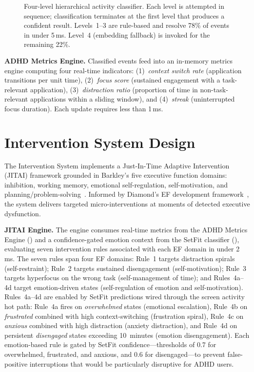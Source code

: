 \begin{figure}[htbp]
\begin{tikzpicture}
  \end{tikzpicture}
  \caption{Four-level hierarchical activity classifier. Each level is attempted in sequence; classification terminates at the first level that produces a confident result. Levels~1--3 are rule-based and resolve 78\% of events in under 5\,ms. Level~4 (embedding fallback) is invoked for the remaining 22\%.}
  \label{fig:activity_classifier}
\end{figure}

\textbf{ADHD Metrics Engine.} Classified events feed into an in-memory metrics engine computing four real-time indicators: (1)~\emph{context switch rate} (application transitions per unit time), (2)~\emph{focus score} (sustained engagement with a task-relevant application), (3)~\emph{distraction ratio} (proportion of time in non-task-relevant applications within a sliding window), and (4)~\emph{streak} (uninterrupted focus duration). Each update requires less than 1\,ms.


\section{Intervention System Design}
\label{sec:intervention_system}

The Intervention System implements a Just-In-Time Adaptive Intervention (JITAI) framework grounded in Barkley's five executive function domains: inhibition, working memory, emotional self-regulation, self-motivation, and planning/problem-solving~\cite{barkley2010}. Informed by Diamond's EF development framework~\cite{diamond2013}, the system delivers targeted micro-interventions at moments of detected executive dysfunction.

\textbf{JITAI Engine.} The engine consumes real-time metrics from the ADHD Metrics Engine () and a confidence-gated emotion context from the SetFit classifier (), evaluating seven intervention rules associated with each EF domain in under 2\,ms. The seven rules span four EF domains: Rule~1 targets distraction spirals (self-restraint); Rule~2 targets sustained disengagement (self-motivation); Rule~3 targets hyperfocus on the wrong task (self-management of time); and Rules~4a--4d target emotion-driven states (self-regulation of emotion and self-motivation). Rules~4a--4d are enabled by SetFit predictions wired through the screen activity hot path: Rule~4a fires on \emph{overwhelmed} states (emotional escalation), Rule~4b on \emph{frustrated} combined with high context-switching (frustration spiral), Rule~4c on \emph{anxious} combined with high distraction (anxiety distraction), and Rule~4d on persistent \emph{disengaged} states exceeding 10~minutes (emotion disengagement). Each emotion-based rule is gated by SetFit confidence---thresholds of 0.7 for overwhelmed, frustrated, and anxious, and 0.6 for disengaged---to prevent false-positive interruptions that would be particularly disruptive for ADHD users.

